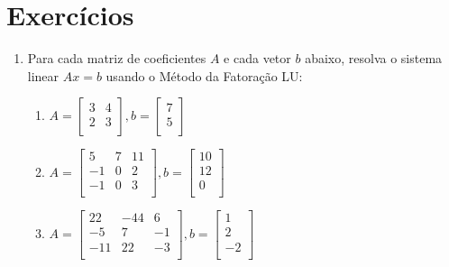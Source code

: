 \documentclass[a4paper]{article}
\begin{document}
\section{Exercícios}

\begin{enumerate}
\item Para cada matriz de coeficientes $A$ e cada vetor $b$ abaixo,
  resolva o sistema linear $Ax=b$ usando o Método da Fatoração LU:
  \begin{enumerate}
  \item %
    $A = \begin{bmatrix}
        3 & 4\\
        2 & 3\\
      \end{bmatrix},
      b= \begin{bmatrix}
        7\\
        5\\
      \end{bmatrix}$

  \item %
    $A = \begin{bmatrix}
      5 & 7 & 11\\
      -1 & 0 & 2\\
      -1 & 0 & 3\\
      \end{bmatrix},
      b= \begin{bmatrix}
        10\\
        12\\
        0\\
      \end{bmatrix}$

  \item %
    $A = \begin{bmatrix}
      22 & -44 & 6\\
      -5 & 7 & -1\\
      -11 & 22 & -3\\
      \end{bmatrix},
      b= \begin{bmatrix}
        1\\
        2\\
        -2\\
      \end{bmatrix}$


\end{enumerate}
\end{enumerate}
\end{document}
